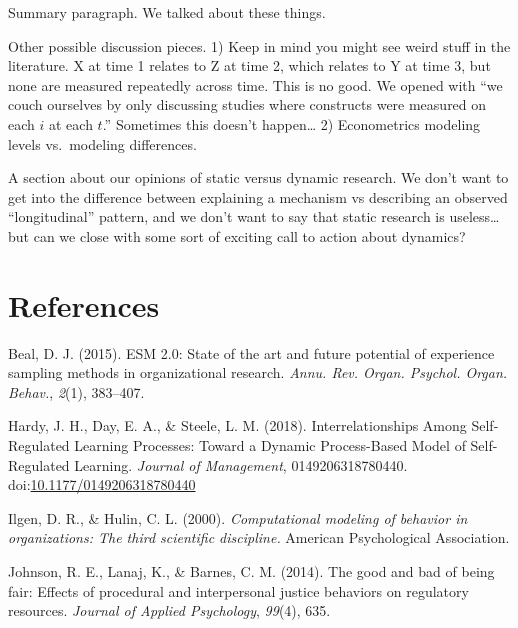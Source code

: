 \documentclass[english,,man]{apa6}
\theoremstyle{definition}
\theoremstyle{definition}
\theoremstyle{definition}
\theoremstyle{remark}
\begin{document}
Summary paragraph. We talked about these things.

Other possible discussion pieces. 1) Keep in mind you might see weird
stuff in the literature. X at time 1 relates to Z at time 2, which
relates to Y at time 3, but none are measured repeatedly across time.
This is no good. We opened with \enquote{we couch ourselves by only
discussing studies where constructs were measured on each \(i\) at each
\(t\).} Sometimes this doesn't happen\ldots{} 2) Econometrics modeling
levels vs.~modeling differences.

A section about our opinions of static versus dynamic research. We don't
want to get into the difference between explaining a mechanism vs
describing an observed \enquote{longitudinal} pattern, and we don't want
to say that static research is useless\ldots{}but can we close with some
sort of exciting call to action about dynamics?

\newpage

\hypertarget{references}{%
\section{References}\label{references}}

\setlength{\parindent}{-0.5in}
\setlength{\leftskip}{0.5in}

\hypertarget{refs}{}
\leavevmode\hypertarget{ref-beal_esm_2015}{}%
Beal, D. J. (2015). ESM 2.0: State of the art and future potential of
experience sampling methods in organizational research. \emph{Annu. Rev.
Organ. Psychol. Organ. Behav.}, \emph{2}(1), 383--407.

\leavevmode\hypertarget{ref-hardy_interrelationships_2018}{}%
Hardy, J. H., Day, E. A., \& Steele, L. M. (2018). Interrelationships
Among Self-Regulated Learning Processes: Toward a Dynamic Process-Based
Model of Self-Regulated Learning. \emph{Journal of Management},
0149206318780440.
doi:\href{https://doi.org/10.1177/0149206318780440}{10.1177/0149206318780440}

\leavevmode\hypertarget{ref-ilgen_computational_2000}{}%
Ilgen, D. R., \& Hulin, C. L. (2000). \emph{Computational modeling of
behavior in organizations: The third scientific discipline.} American
Psychological Association.

\leavevmode\hypertarget{ref-johnson_good_2014}{}%
Johnson, R. E., Lanaj, K., \& Barnes, C. M. (2014). The good and bad of
being fair: Effects of procedural and interpersonal justice behaviors on
regulatory resources. \emph{Journal of Applied Psychology},
\emph{99}(4), 635.
\end{document}
